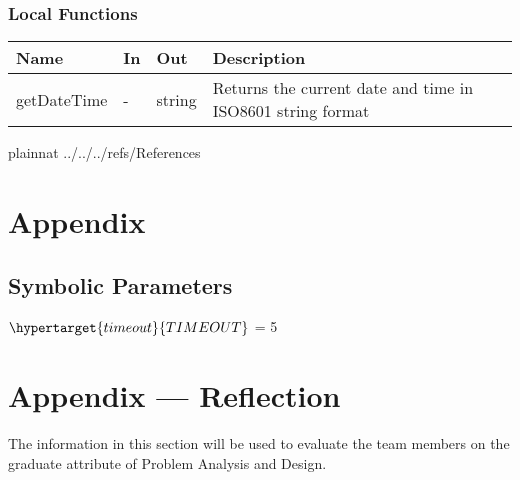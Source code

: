 \documentclass[12pt, titlepage]{article}
\begin{document}
  \subsubsection{Local Functions}

  \begin{center}
    \begin{tabular}{>{\raggedright}p{4cm} >{\raggedright}p{3cm}
      >{\raggedright}p{3.5cm} p{5.5cm}}
      \hline
      \textbf{Name} & \textbf{In} & \textbf{Out} & \textbf{Description} \\
      \hline
      getDateTime & - & string & Returns the current date and time in ISO8601
      string format\\
      \hline
    \end{tabular}
  \end{center}

  \newpage

   {plainnat}
   {../../../refs/References}

  \newpage

  \section{Appendix} \label{Appendix}

  \subsection{Symbolic Parameters}
  $\hypertarget{timeout}{TIMEOUT}$ = 5\\

  \newpage{}

  \section*{Appendix --- Reflection}


  The information in this section will be used to evaluate the team
  members on the
  graduate attribute of Problem Analysis and Design.

  
\end{document}
